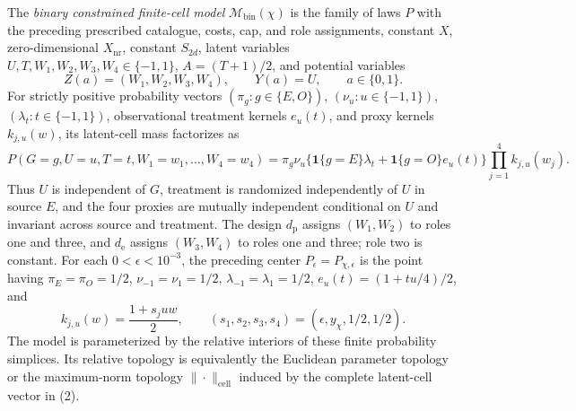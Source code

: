 The \emph{binary constrained finite-cell model} \(\mathcal M_{\mathrm{bin}}(\chi)\) is the family of laws \(P\) with the preceding prescribed catalogue, costs, cap, and role assignments, constant \(X\), zero-dimensional \(X_{\mathrm{nr}}\), constant \(S_{2d}\), latent variables \(U,T,W_1,W_2,W_3,W_4\in\{-1,1\}\), \(A=(T+1)/2\), and potential variables
\[
 Z(a)=(W_1,W_2,W_3,W_4),\qquad Y(a)=U,
 \qquad a\in\{0,1\}.
\]
For strictly positive probability vectors \((\pi_g:g\in\{E,O\})\), \((\nu_u:u\in\{-1,1\})\), \((\lambda_t:t\in\{-1,1\})\), observational treatment kernels \(e_u(t)\), and proxy kernels \(k_{j,u}(w)\), its latent-cell mass factorizes as
\[
 P(G=g,U=u,T=t,W_1=w_1,\ldots,W_4=w_4)
 =\pi_g\nu_u\bigl\{\mathbf 1\{g=E\}\lambda_t
 +\mathbf 1\{g=O\}e_u(t)\bigr\}
 \prod_{j=1}^4k_{j,u}(w_j).                               \tag{2}
\]
Thus \(U\) is independent of \(G\), treatment is randomized independently of \(U\) in source \(E\), and the four proxies are mutually independent conditional on \(U\) and invariant across source and treatment. The design \(d_{\mathrm p}\) assigns \((W_1,W_2)\) to roles one and three, and \(d_{\mathrm e}\) assigns \((W_3,W_4)\) to roles one and three; role two is constant. For each \(0<\epsilon<10^{-3}\), the preceding center \(P_{\epsilon}=P_{\chi,\epsilon}\) is the point having \(\pi_E=\pi_O=1/2\), \(\nu_{-1}=\nu_1=1/2\), \(\lambda_{-1}=\lambda_1=1/2\), \(e_u(t)=(1+tu/4)/2\), and
\[
 k_{j,u}(w)=\frac{1+s_juw}{2},
 \qquad
 (s_1,s_2,s_3,s_4)=(\epsilon,y_{\chi},1/2,1/2).
\]
The model is parameterized by the relative interiors of these finite probability simplices. Its relative topology is equivalently the Euclidean parameter topology or the maximum-norm topology \(\|\cdot\|_{\mathrm{cell}}\) induced by the complete latent-cell vector in (2).